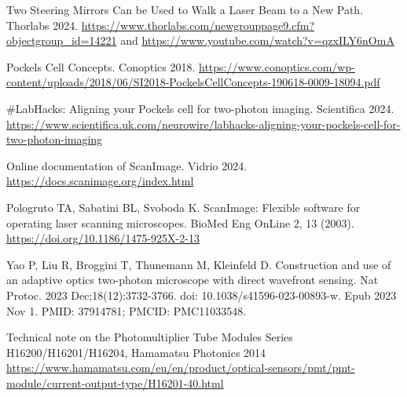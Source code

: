 \documentclass[10pt,letterpaper]{article}
\begin{document}
\begin{thebibliography}{10}

Two Steering Mirrors Can be Used to Walk a Laser Beam to a New Path. Thorlabs 2024. 
\url{https://www.thorlabs.com/newgrouppage9.cfm?objectgroup_id=14221} and \url{https://www.youtube.com/watch?v=qzxILY6nOmA}

Pockels Cell Concepts. Conoptics 2018.
\url{https://www.conoptics.com/wp-content/uploads/2018/06/SI2018-PockelsCellConcepts-190618-0009-18094.pdf}

\#LabHacks: Aligning your Pockels cell for two-photon imaging. Scientifica 2024.
\url{https://www.scientifica.uk.com/neurowire/labhacks-aligning-your-pockels-cell-for-two-photon-imaging}

Online documentation of ScanImage. Vidrio 2024. \url{https://docs.scanimage.org/index.html}

Pologruto TA, Sabatini BL, Svoboda K. ScanImage: Flexible software for operating laser scanning microscopes. BioMed Eng OnLine 2, 13 (2003). \url{https://doi.org/10.1186/1475-925X-2-13}

Yao P, Liu R, Broggini T, Thunemann M, Kleinfeld D. Construction and use of an adaptive optics two-photon microscope with direct wavefront sensing. Nat Protoc. 2023 Dec;18(12):3732-3766. doi: 10.1038/s41596-023-00893-w. Epub 2023 Nov 1. PMID: 37914781; PMCID: PMC11033548.

Technical note on the Photomultiplier Tube Modules Series
H16200/H16201/H16204, Hamamatsu Photonics 2014 \url{https://www.hamamatsu.com/eu/en/product/optical-sensors/pmt/pmt-module/current-output-type/H16201-40.html}

\end{thebibliography}
\end{document}
